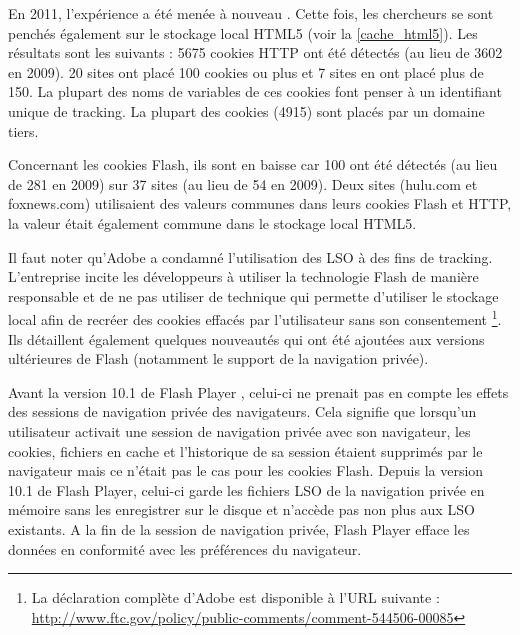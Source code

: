 En 2011, l'expérience a été menée à nouveau \cite{flash_cookies_privacy_2}. Cette fois, les chercheurs se sont penchés également sur le stockage local HTML5 (voir la \autoref{cache_html5}). Les résultats sont les suivants : 5675 cookies HTTP ont été détectés (au lieu de 3602 en 2009). 20 sites ont placé 100 cookies ou plus et 7 sites en ont placé plus de 150. La plupart des noms de variables de ces cookies font penser à un identifiant unique de tracking. La plupart des cookies (4915) sont placés par un domaine tiers.

Concernant les cookies Flash, ils sont en baisse car 100 ont été détectés (au lieu de 281 en 2009) sur 37 sites (au lieu de 54 en 2009).
Deux sites (hulu.com et foxnews.com) utilisaient des valeurs communes dans leurs cookies Flash et HTTP, la valeur était également commune dans le stockage local HTML5.
\newline

Il faut noter qu'Adobe a condamné l'utilisation des LSO à des fins de tracking. L'entreprise incite les développeurs à utiliser la technologie Flash de manière responsable et de ne pas utiliser de technique qui permette d'utiliser le stockage local afin de recréer des cookies effacés par l'utilisateur sans son consentement \footnote{La déclaration complète d'Adobe est disponible à l'URL suivante : \url{http://www.ftc.gov/policy/public-comments/comment-544506-00085}}. Ils détaillent également quelques nouveautés qui ont été ajoutées aux versions ultérieures de Flash (notamment le support de la navigation privée).
\newline

Avant la version 10.1 de Flash Player \cite{flash_private}, celui-ci ne prenait pas en compte les effets des sessions de navigation privée des navigateurs. Cela signifie que lorsqu'un utilisateur activait une session de navigation privée avec son navigateur, les cookies, fichiers en cache et l'historique de sa session étaient supprimés par le navigateur mais ce n'était pas le cas pour les cookies Flash. Depuis la version 10.1 de Flash Player, celui-ci garde les fichiers LSO de la navigation privée en mémoire sans les enregistrer sur le disque et n'accède pas non plus aux LSO existants. A la fin de la session de navigation privée, Flash Player efface les données en conformité avec les préférences du navigateur.

